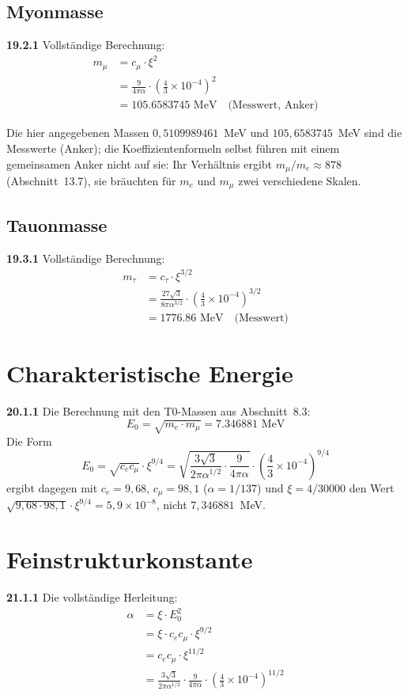 \subsection{Myonmasse}
\noindent \textbf{19.2.1} Vollständige Berechnung:
\begin{align}
	m_\mu &= c_\mu \cdot \xi^2 \\
	&= \frac{9}{4\pi\alpha} \cdot \left(\frac{4}{3} \times 10^{-4}\right)^2 \\
	&= 105.6583745 \text{ MeV} \quad \text{(Messwert, Anker)}
\end{align}

Die hier angegebenen Massen $0{,}5109989461$~MeV und $105{,}6583745$~MeV sind die Messwerte (Anker); die Koeffizientenformeln selbst führen mit einem gemeinsamen Anker nicht auf sie: Ihr Verhältnis ergibt $m_\mu/m_e \approx 878$ (Abschnitt~13.7), sie bräuchten für $m_e$ und $m_\mu$ zwei verschiedene Skalen.

\subsection{Tauonmasse}
\noindent \textbf{19.3.1} Vollständige Berechnung:
\begin{align}
	m_\tau &= c_\tau \cdot \xi^{3/2} \\
	&= \frac{27\sqrt{3}}{8\pi\alpha^{3/2}} \cdot \left(\frac{4}{3} \times 10^{-4}\right)^{3/2} \\
	&= 1776.86 \text{ MeV} \quad \text{(Messwert)}
\end{align}

\section{Charakteristische Energie}
\noindent \textbf{20.1.1} Die Berechnung mit den T0-Massen aus Abschnitt~8.3:
\begin{equation}
	E_0 = \sqrt{m_e \cdot m_\mu} = 7.346881 \text{ MeV}
\end{equation}
Die Form
\begin{equation}
	E_0 = \sqrt{c_e c_\mu} \cdot \xi^{9/4} = \sqrt{\frac{3\sqrt{3}}{2\pi\alpha^{1/2}} \cdot \frac{9}{4\pi\alpha}} \cdot \left(\frac{4}{3} \times 10^{-4}\right)^{9/4}
\end{equation}
ergibt dagegen mit $c_e = 9{,}68$, $c_\mu = 98{,}1$ ($\alpha = 1/137$) und $\xi = 4/30000$ den Wert $\sqrt{9{,}68\cdot98{,}1}\cdot\xi^{9/4} = 5{,}9\times10^{-8}$, nicht $7{,}346881$~MeV.

\section{Feinstrukturkonstante}
\noindent \textbf{21.1.1} Die vollständige Herleitung:
\begin{align}
	\alpha &= \xi \cdot E_0^2 \\
	&= \xi \cdot c_e c_\mu \cdot \xi^{9/2} \\
	&= c_e c_\mu \cdot \xi^{11/2} \\
	&= \frac{3\sqrt{3}}{2\pi\alpha^{1/2}} \cdot \frac{9}{4\pi\alpha} \cdot \left(\frac{4}{3} \times 10^{-4}\right)^{11/2}
\end{align}

